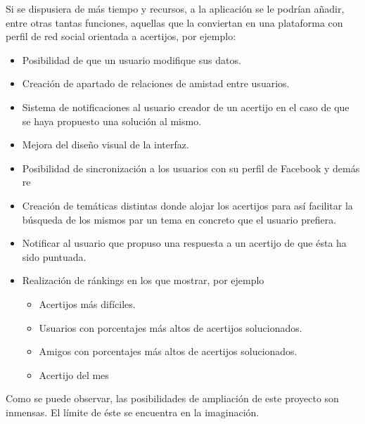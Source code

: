 Si se dispusiera de más tiempo y recursos, a la aplicación se le podrían añadir, entre otras tantas funciones, aquellas que la conviertan en una plataforma con perfil de red social orientada a acertijos, por ejemplo:

\begin{itemize}
    \item Posibilidad de que un usuario modifique sus datos.
    \item Creación de apartado de relaciones de amistad entre usuarios.
    \item Sistema de notificaciones al usuario creador de un acertijo en el caso de que se haya propuesto una solución al mismo.
    \item Mejora del diseño visual de la interfaz.
    \item Posibilidad de sincronización a los usuarios con su perfil de Facebook y demás re
    \item Creación de temáticas distintas donde alojar los acertijos para así facilitar la búsqueda de los mismos par un tema en concreto que el usuario prefiera.
    \item Notificar al usuario que propuso una respuesta a un acertijo de que ésta ha sido puntuada.
    \item Realización de ránkings en los que mostrar, por ejemplo 
        \begin{itemize}
            \item Acertijos más difíciles.
            \item Usuarios con porcentajes más altos de acertijos solucionados.
            \item Amigos con porcentajes más altos de acertijos solucionados.
            \item Acertijo del mes
        \end{itemize}
\end{itemize}

Como se puede observar, las posibilidades de ampliación de este proyecto son inmensas. El límite de éste se encuentra en la imaginación.